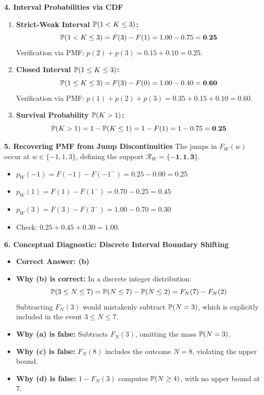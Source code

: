 \textbf{4. Interval Probabilities via CDF}
\begin{enumerate}
    \item \textbf{Strict-Weak Interval $\P(1 < K \le 3)$:}
    $$\P(1 < K \le 3) = F(3) - F(1) = 1.00 - 0.75 = \mathbf{0.25}$$
    Verification via PMF: $p(2) + p(3) = 0.15 + 0.10 = 0.25$.
    \item \textbf{Closed Interval $\P(1 \le K \le 3)$:}
    $$\P(1 \le K \le 3) = F(3) - F(0) = 1.00 - 0.40 = \mathbf{0.60}$$
    Verification via PMF: $p(1) + p(2) + p(3) = 0.35 + 0.15 + 0.10 = 0.60$.
    \item \textbf{Survival Probability $\P(K > 1)$:}
    $$\P(K > 1) = 1 - \P(K \le 1) = 1 - F(1) = 1 - 0.75 = \mathbf{0.25}$$
\end{enumerate}

\textbf{5. Recovering PMF from Jump Discontinuities}
The jumps in $F_W(w)$ occur at $w \in \{-1, 1, 3\}$, defining the support $\mathcal{R}_W = \mathbf{\{-1, 1, 3\}}$.
\begin{itemize}
    \item $p_W(-1) = F(-1) - F(-1^-) = 0.25 - 0.00 = \mathbf{0.25}$
    \item $p_W(1) = F(1) - F(1^-) = 0.70 - 0.25 = \mathbf{0.45}$
    \item $p_W(3) = F(3) - F(3^-) = 1.00 - 0.70 = \mathbf{0.30}$
    \item Check: $0.25 + 0.45 + 0.30 = 1.00$.
\end{itemize}

\textbf{6. Conceptual Diagnostic: Discrete Interval Boundary Shifting}
\begin{itemize}
    \item \textbf{Correct Answer: (b)}
    \item \textbf{Why (b) is correct:} In a discrete integer distribution:
    $$\P(3 \le N \le 7) = \P(N \le 7) - \P(N \le 2) = F_N(7) - F_N(2)$$
    Subtracting $F_N(3)$ would mistakenly subtract $\P(N = 3)$, which is explicitly included in the event $3 \le N \le 7$.
    \item \textbf{Why (a) is false:} Subtracts $F_N(3)$, omitting the mass $\P(N = 3)$.
    \item \textbf{Why (c) is false:} $F_N(8)$ includes the outcome $N = 8$, violating the upper bound.
    \item \textbf{Why (d) is false:} $1 - F_N(3)$ computes $\P(N \ge 4)$, with no upper bound at $7$.
\end{itemize}

